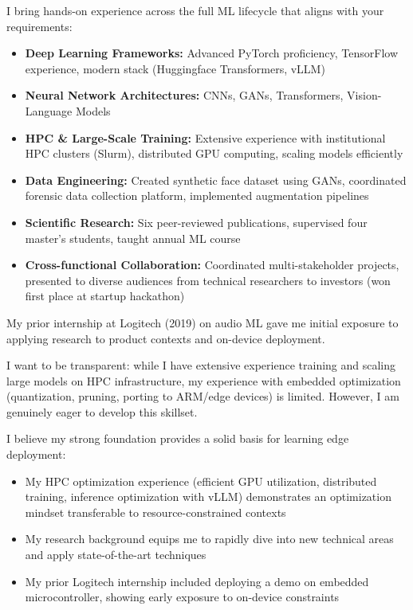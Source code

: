 \documentclass[11pt, a4paper]{awesome-cv}
\begin{document}
\begin{cvletter}
I bring hands-on experience across the full ML lifecycle that aligns with your requirements:
\begin{itemize}
  \item \textbf{Deep Learning Frameworks:} Advanced PyTorch proficiency, TensorFlow experience, modern stack (Huggingface Transformers, vLLM)
  \item \textbf{Neural Network Architectures:} CNNs, GANs, Transformers, Vision-Language Models
  \item \textbf{HPC \& Large-Scale Training:} Extensive experience with institutional HPC clusters (Slurm), distributed GPU computing, scaling models efficiently
  \item \textbf{Data Engineering:} Created synthetic face dataset using GANs, coordinated forensic data collection platform, implemented augmentation pipelines
  \item \textbf{Scientific Research:} Six peer-reviewed publications, supervised four master's students, taught annual ML course
  \item \textbf{Cross-functional Collaboration:} Coordinated multi-stakeholder projects, presented to diverse audiences from technical researchers to investors (won first place at startup hackathon)
\end{itemize}

My prior internship at Logitech (2019) on audio ML gave me initial exposure to applying research to product contexts and on-device deployment.

I want to be transparent: while I have extensive experience training and scaling large models on HPC infrastructure, my experience with embedded optimization (quantization, pruning, porting to ARM/edge devices) is limited. However, I am genuinely eager to develop this skillset.

I believe my strong foundation provides a solid basis for learning edge deployment:
\begin{itemize}
  \item My HPC optimization experience (efficient GPU utilization, distributed training, inference optimization with vLLM) demonstrates an optimization mindset transferable to resource-constrained contexts
  \item My research background equips me to rapidly dive into new technical areas and apply state-of-the-art techniques
  \item My prior Logitech internship included deploying a demo on embedded microcontroller, showing early exposure to on-device constraints
\end{itemize}


\end{cvletter}
\end{document}
